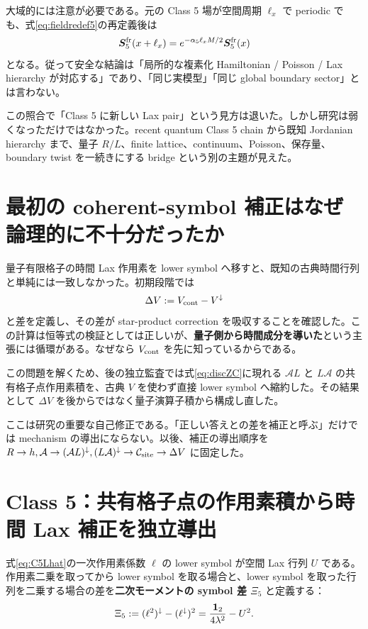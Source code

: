 大域的には注意が必要である。元の Class 5 場が空間周期 $\ell_x$ で periodic でも、式\eqref{eq:fieldredef5}の再定義後は
\begin{equation}
\boldsymbol S_5^{\rm fr}(x+\ell_x)=e^{-\alpha_5\ell_xM/2}\boldsymbol S_5^{\rm fr}(x)
\label{eq:C5twistBC}
\end{equation}
となる。従って安全な結論は「局所的な複素化 Hamiltonian / Poisson / Lax hierarchy が対応する」であり、「同じ実模型」「同じ global boundary sector」とは言わない。

\begin{historymemo}
この照合で「Class 5 に新しい Lax pair」という見方は退いた。しかし研究は弱くなっただけではなかった。recent quantum Class 5 chain から既知 Jordanian hierarchy まで、量子 $R/L$、finite lattice、continuum、Poisson、保存量、boundary twist を一続きにする bridge という別の主題が見えた。
\end{historymemo}

\section{最初の coherent-symbol 補正はなぜ論理的に不十分だったか}
量子有限格子の時間 Lax 作用素を lower symbol へ移すと、既知の古典時間行列と単純には一致しなかった。初期段階では
\begin{equation}
\Delta V:=V_{\rm cont}-V^\downarrow
\label{eq:circularDelta}
\end{equation}
と差を定義し、その差が star-product correction を吸収することを確認した。この計算は恒等式の検証としては正しいが、\textbf{量子側から時間成分を導いた}という主張には循環がある。なぜなら $V_{\rm cont}$ を先に知っているからである。

この問題を解くため、後の独立監査では式\eqref{eq:discZC}に現れる $\mathcal A L$ と $L\mathcal A$ の共有格子点作用素積を、古典 $V$ を使わず直接 lower symbol へ縮約した。その結果として $\Delta V$ を後からではなく量子演算子積から構成し直した。

\begin{historymemo}
ここは研究の重要な自己修正である。「正しい答えとの差を補正と呼ぶ」だけでは mechanism の導出にならない。以後、補正の導出順序を $R\to h,\mathcal A\to(\mathcal AL)^\downarrow,(L\mathcal A)^\downarrow\to\mathcal C_{\rm site}\to\Delta V$ に固定した。
\end{historymemo}

\section{Class 5：共有格子点の作用素積から時間 Lax 補正を独立導出}
式\eqref{eq:C5Lhat}の一次作用素係数 $\ell$ の lower symbol が空間 Lax 行列 $U$ である。作用素二乗を取ってから lower symbol を取る場合と、lower symbol を取った行列を二乗する場合の差を\textbf{二次モーメントの symbol 差 $\Xi_5$} と定義する：
\begin{equation}
\Xi_5:=(\ell^2)^\downarrow-(\ell^\downarrow)^2
=\frac{\mathbf 1_{2}}{4\lambda^2}-U^2.
\label{eq:Xi5}
\end{equation}

